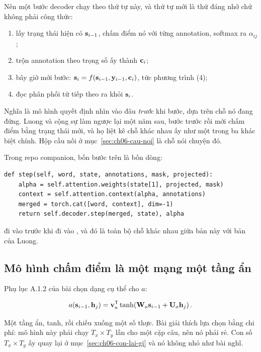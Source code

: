 Nên một bước decoder chạy theo thứ tự này, và thứ tự mới là thứ đáng nhớ chứ
không phải công thức:

\begin{enumerate}
  \item lấy trạng thái hiện có \(\mathbf{s}_{i-1}\), chấm điểm nó với từng
    annotation, softmax ra \(\alpha_{ij}\);
  \item trộn annotation theo trọng số ấy thành \(\mathbf{c}_i\);
  \item bây giờ mới bước: \(\mathbf{s}_i = f(\mathbf{s}_{i-1}, \mathbf{y}_{i-1},
    \mathbf{c}_i)\), tức phương trình (4);
  \item đọc phân phối từ tiếp theo ra khỏi \(\mathbf{s}_i\).
\end{enumerate}

Nghĩa là mô hình quyết định nhìn vào đâu \emph{trước} khi bước, dựa trên chỗ nó
đang đứng. Luong và cộng sự làm ngược lại một năm sau, bước trước rồi mới chấm
điểm bằng trạng thái mới, và họ liệt kê chỗ khác nhau ấy như một trong ba khác
biệt chính. Hộp cầu nối ở mục~\ref{sec:ch06-cau-noi} là chỗ nói chuyện đó.

Trong repo companion, bốn bước trên là bốn dòng:

\begin{verbatim}
def step(self, word, state, annotations, mask, projected):
    alpha = self.attention.weights(state[1], projected, mask)
    context = self.attention.context(alpha, annotations)
    merged = torch.cat([word, context], dim=-1)
    return self.decoder.step(merged, state), alpha
\end{verbatim}

 đi vào  trước khi đi vào , và đó
là toàn bộ chỗ khác nhau giữa bản này với bản của Luong.

\subsection*{Mô hình chấm điểm là một mạng một tầng ẩn}

%
Phụ lục A.1.2 của bài chọn dạng cụ thể cho \(a\):

\begin{equation}
  a(\mathbf{s}_{i-1}, \mathbf{h}_j)
  = \mathbf{v}_a^{\mathsf{T}} \tanh\!\left(
      \mathbf{W}_a \mathbf{s}_{i-1} + \mathbf{U}_a \mathbf{h}_j
    \right).
  \label{eq:ch06-ham-cham-diem}
\end{equation}

Một tầng ẩn, tanh, rồi chiếu xuống một số thực. Bài giải thích lựa chọn bằng
chi phí: mô hình này phải chạy \(T_x \times T_y\) lần cho một cặp câu, nên nó
phải rẻ. Con số \(T_x \times T_y\) ấy quay lại ở mục~\ref{sec:ch06-con-lai-gi}
và nó không nhỏ như bài nghĩ.

